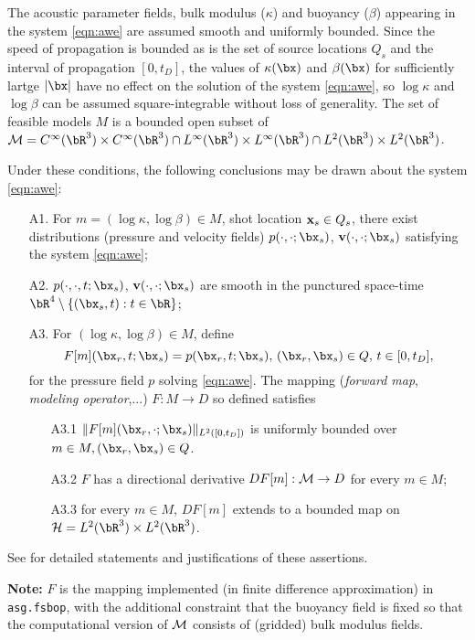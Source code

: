 The acoustic parameter fields, bulk modulus ($\kappa$) and buoyancy ($\beta$) appearing in the system \ref{eqn:awe} are assumed smooth and uniformly bounded.
Since the speed of propagation is bounded as is the set of source locations $Q_s$ and the interval of propagation $[0,t_D]$, the values of $\kappa(\bx)$ and $\beta(\bx)$ for sufficiently lartge $|\bx|$ have no effect on the solution of the system \ref{eqn:awe}, so $\log \kappa$ and $\log \beta$ can be assumed square-integrable without loss of generality. The set of feasible models $M$ is a  bounded open subset of ${\cal M} = C^{\infty}(\bR^3) \times C^{\infty}(\bR^3) \cap L^{\infty}(\bR^3) \times L^{\infty}(\bR^3) \cap L^2(\bR^3) \times L^2(\bR^3)$.

Under these conditions, the following conclusions may be drawn about the system \ref{eqn:awe}:
\begin{itemize}
  \item[A1. ] For $m = (\log \kappa, \log \beta) \in M$, shot location ${\bf x}_s\in Q_s$, there exist distributions (pressure and velocity fields) $p(\cdot,\cdot;\bx_s)$, ${\bf v}(\cdot,\cdot;\bx_s)$ satisfying the system \ref{eqn:awe};
  \item[A2. ] $p(\cdot,\cdot,t;\bx_s)$, ${\bf v}(\cdot,\cdot;\bx_s)$ are smooth in the punctured space-time $\bR^4 \setminus \{(\bx_s,t): t \in \bR\}$;
    \item[A3. ] For $(\log \kappa, \log \beta) \in M$, define 
\[
  F[m](\bx_r,t;\bx_s) = p(\bx_r,t;\bx_s), \, (\bx_r,\bx_s) \in Q, \, t \in [0,t_D],
\]
for the pressure field $p$ solving \ref{eqn:awe}. The mapping ({\em forward map}, {\em modeling operator},...) $F: M \rightarrow D$ so defined satisfies
\begin{itemize}
  \item[A3.1 ] $\|F[m](\bx_r,\cdot;\bx_s)\|_{L^2([0,t_D])}$ is uniformly bounded over $m \in M, (\bx_r,\bx_s) \in Q$.
  \item[A3.2 ] $F$ has a directional derivative $DF[m]: {\cal M} \rightarrow D$ for every $m \in M$;
  \item[A3.3 ] for every $m \in M$, $DF[m]$ extends to a bounded map on ${\cal H} = L^2(\bR^3) \times L^2(\bR^3)$.
  \end{itemize}
\end{itemize}
See \cite{Symes:23a} for detailed statements and justifications of these assertions.

{\bf Note:}
$F$ is the mapping implemented (in finite difference approximation) in {\tt asg.fsbop}, with the additional constraint that the buoyancy field is fixed so that the computational version of ${\cal M}$ consists of (gridded) bulk modulus fields.

